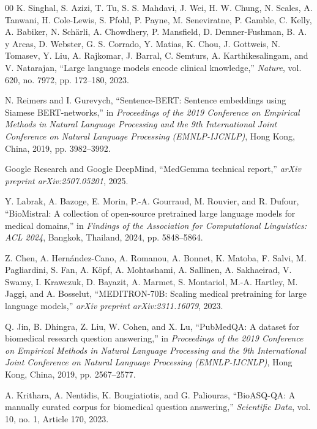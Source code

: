 \documentclass[conference]{IEEEtran}
\begin{document}
\begin{thebibliography}{00}
K. Singhal, S. Azizi, T. Tu, S. S. Mahdavi, J. Wei, H. W. Chung, N. Scales, A. Tanwani, H. Cole-Lewis, S. Pfohl, P. Payne, M. Seneviratne, P. Gamble, C. Kelly, A. Babiker, N. Sch\"{a}rli, A. Chowdhery, P. Mansfield, D. Demner-Fushman, B. A. y Arcas, D. Webster, G. S. Corrado, Y. Matias, K. Chou, J. Gottweis, N. Tomasev, Y. Liu, A. Rajkomar, J. Barral, C. Semturs, A. Karthikesalingam, and V. Natarajan, ``Large language models encode clinical knowledge,'' \emph{Nature}, vol. 620, no. 7972, pp. 172--180, 2023.

N. Reimers and I. Gurevych, ``Sentence-BERT: Sentence embeddings using Siamese BERT-networks,'' in \emph{Proceedings of the 2019 Conference on Empirical Methods in Natural Language Processing and the 9th International Joint Conference on Natural Language Processing (EMNLP-IJCNLP)}, Hong Kong, China, 2019, pp. 3982--3992.

Google Research and Google DeepMind, ``MedGemma technical report,'' \emph{arXiv preprint arXiv:2507.05201}, 2025.

Y. Labrak, A. Bazoge, E. Morin, P.-A. Gourraud, M. Rouvier, and R. Dufour, ``BioMistral: A collection of open-source pretrained large language models for medical domains,'' in \emph{Findings of the Association for Computational Linguistics: ACL 2024}, Bangkok, Thailand, 2024, pp. 5848--5864.

Z. Chen, A. Hern\'{a}ndez-Cano, A. Romanou, A. Bonnet, K. Matoba, F. Salvi, M. Pagliardini, S. Fan, A. K\"{o}pf, A. Mohtashami, A. Sallinen, A. Sakhaeirad, V. Swamy, I. Krawczuk, D. Bayazit, A. Marmet, S. Montariol, M.-A. Hartley, M. Jaggi, and A. Bosselut, ``MEDITRON-70B: Scaling medical pretraining for large language models,'' \emph{arXiv preprint arXiv:2311.16079}, 2023.

Q. Jin, B. Dhingra, Z. Liu, W. Cohen, and X. Lu, ``PubMedQA: A dataset for biomedical research question answering,'' in \emph{Proceedings of the 2019 Conference on Empirical Methods in Natural Language Processing and the 9th International Joint Conference on Natural Language Processing (EMNLP-IJCNLP)}, Hong Kong, China, 2019, pp. 2567--2577.

A. Krithara, A. Nentidis, K. Bougiatiotis, and G. Paliouras, ``BioASQ-QA: A manually curated corpus for biomedical question answering,'' \emph{Scientific Data}, vol. 10, no. 1, Article 170, 2023.


\end{thebibliography}
\end{document}
